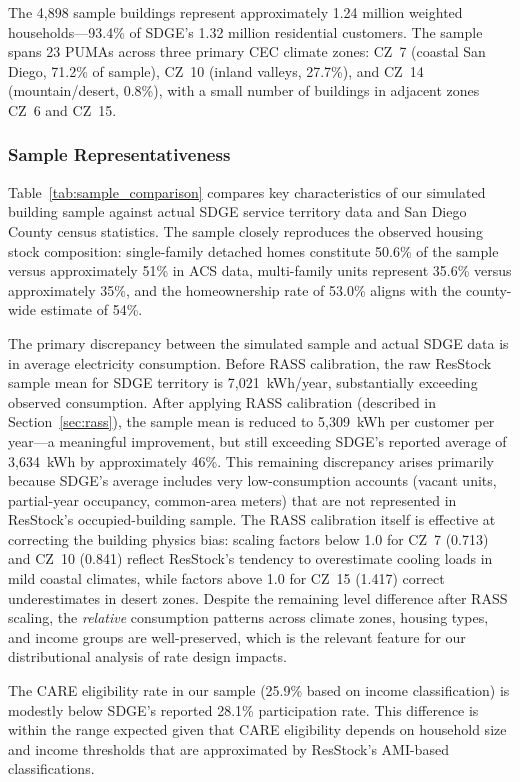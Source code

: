 \documentclass[12pt]{article}
\begin{document}
The 4,898 sample buildings represent approximately 1.24 million weighted households---93.4\% of SDGE's 1.32 million residential customers. The sample spans 23 PUMAs across three primary CEC climate zones: CZ~7 (coastal San Diego, 71.2\% of sample), CZ~10 (inland valleys, 27.7\%), and CZ~14 (mountain/desert, 0.8\%), with a small number of buildings in adjacent zones CZ~6 and CZ~15.

\subsubsection{Sample Representativeness}
\label{sec:representativeness}

Table~\ref{tab:sample_comparison} compares key characteristics of our simulated building sample against actual SDGE service territory data and San Diego County census statistics. The sample closely reproduces the observed housing stock composition: single-family detached homes constitute 50.6\% of the sample versus approximately 51\% in ACS data, multi-family units represent 35.6\% versus approximately 35\%, and the homeownership rate of 53.0\% aligns with the county-wide estimate of 54\%.

The primary discrepancy between the simulated sample and actual SDGE data is in average electricity consumption. Before RASS calibration, the raw ResStock sample mean for SDGE territory is 7,021~kWh/year, substantially exceeding observed consumption. After applying RASS calibration (described in Section~\ref{sec:rass}), the sample mean is reduced to 5,309~kWh per customer per year---a meaningful improvement, but still exceeding SDGE's reported average of 3,634~kWh by approximately 46\%. This remaining discrepancy arises primarily because SDGE's average includes very low-consumption accounts (vacant units, partial-year occupancy, common-area meters) that are not represented in ResStock's occupied-building sample. The RASS calibration itself is effective at correcting the building physics bias: scaling factors below 1.0 for CZ~7 (0.713) and CZ~10 (0.841) reflect ResStock's tendency to overestimate cooling loads in mild coastal climates, while factors above 1.0 for CZ~15 (1.417) correct underestimates in desert zones. Despite the remaining level difference after RASS scaling, the \textit{relative} consumption patterns across climate zones, housing types, and income groups are well-preserved, which is the relevant feature for our distributional analysis of rate design impacts.

The CARE eligibility rate in our sample (25.9\% based on income classification) is modestly below SDGE's reported 28.1\% participation rate. This difference is within the range expected given that CARE eligibility depends on household size and income thresholds that are approximated by ResStock's AMI-based classifications.
\end{document}
